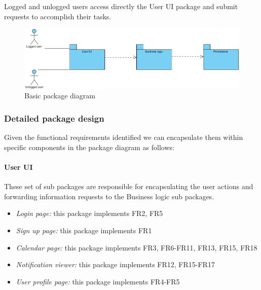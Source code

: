 \documentclass[10pt,a4paper,titlepage]{article}
\begin{document}
Logged and unlogged users access directly the User UI package and submit requests to accomplish their tasks.

\begin{figure}[h]
\centering
\includegraphics[width=\linewidth]{./images/basic-package}
\caption[Basic package]{Basic package diagram}
\label{fig:basic-package}
\end{figure}

\subsubsection{Detailed package design}
Given the functional requirements identified we can encapsulate them within specific components in the package diagram as follows:

\paragraph{User UI}
These set of sub packages are responsible for encapsulating the user actions and forwarding information requests to the Business logic sub packages.
\begin{itemize}
\item \emph{Login page:} this package implements FR2, FR5
\item \emph{Sign up page:} this package implements FR1
\item \emph{Calendar page:} this package implements FR3, FR6-FR11, FR13, FR15, FR18
\item \emph{Notification viewer:} this package implements FR12, FR15-FR17
\item \emph{User profile page:} this package implements FR4-FR5
\end{itemize}
\end{document}
